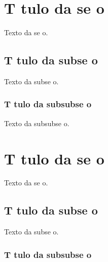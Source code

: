 \documentclass{article}
\begin{document}
\section{T tulo da se o}

Texto da se o.

\subsection{T tulo da subse o}

Texto da subse o.

\subsubsection{T tulo da subsubse o}

Texto da subsubse o.


\section{T tulo da se o}

Texto da se o.

\subsection{T tulo da subse o}

Texto da subse o.

\subsubsection{T tulo da subsubse o}
\end{document}
